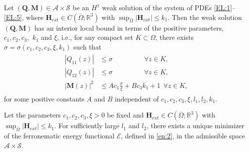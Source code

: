 \documentclass[10pt,a4paper]{amsart}
\def \Mvec{\mathbf{M}}
\def\Hvec{\mathbf{H}}
\def\Qvec{\mathbf{Q}}
\begin{document}
\begin{lemma}\label{lem1}
Let $\left(\Qvec, \Mvec\right)\in\mathcal{A}\times\mathcal{S}$ be an $H^1$ weak solution of the system of PDEs \eqref{EL:1}--\eqref{EL:5}, where $\Hvec_{ext}\in C\left(\overline{\Omega}; \mathbb R^3\right)$ with $\sup_{\bar{\Omega}}|\Hvec_{ext}|\le k_1$. Then the weak solution $\left(\Qvec, \Mvec\right)$ has an interior local bound in terms of the positive parameters, $c_1, c_2, c_3,$ $k_1$ and $\xi$, i.e., for any compact set $K\subset\Omega$, there exists $\sigma = \sigma\left(c_1, c_2, c_3, \xi, k_1\right)$ such that 
\begin{eqnarray} 
\begin{aligned}
|Q_{11}(z)| &\leq \sigma~~~~~~~~~~~~~~~~~~~~~\forall z\in K,\label{eq:Qmax}\\
|Q_{12}(z)| &\leq \sigma~~~~~~~~~~~~~~~~~~~~~\forall z\in K,\\
|\Mvec(z)|^2 &\leq A c_1 \frac{\sigma}{\xi} + Bc_3k_1 + 1~~\forall z\in K, \label{eq:Mmax}
\end{aligned}
\end{eqnarray}
for some positive constants $A$ and $B$ independent of $c_1, c_2, c_3, \xi, l_1, l_2, k_1$.
\end{lemma}

\begin{theorem}\label{thm:2}
Let the parameters $c_1,c_2,c_3, \xi>0$ be fixed and $\Hvec_{ext}\in C\left(\overline{\Omega}; \mathbb R^3\right)$  with $\sup_{\bar{\Omega}}|\Hvec_{ext}|\le k_1$. For sufficiently large $l_1$ and $l_2$, there exists a unique minimizer of the ferronematic energy functional $\mathcal{E}$, defined in \eqref{en:2}, in the admissible space $\mathcal{A}\times\mathcal{S}$. 
\end{theorem}
\end{document}

